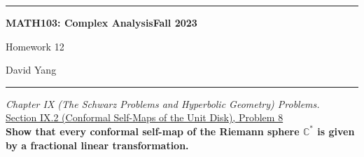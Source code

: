 \documentclass[11pt]{article}
\newcommand{\C}{\mathbb{C}}
\theoremstyle{definition}
\begin{document}
	\hrule
	\begin{center}
        \textbf{MATH103: Complex Analysis}\hfill \textbf{Fall 2023}\newline


		{\Large Homework 12}

		David Yang
	\end{center}

\hrule

\vspace{1em}


\textit{Chapter IX (The Schwarz Problems and Hyperbolic Geometry) Problems.} \\

\underline{Section IX.2 (Conformal Self-Maps of the Unit Disk), Problem 8}\\

\textbf{Show that every conformal self-map of the Riemann sphere $\C^*$ is given by a fractional linear transformation.}
\end{document}
